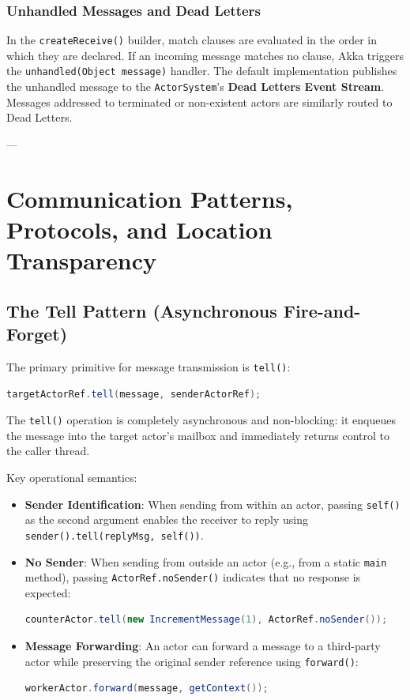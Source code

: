 \subsubsection{Unhandled Messages and Dead Letters}
In the \texttt{createReceive()} builder, match clauses are evaluated in the order in which they are declared. If an incoming message matches no clause, Akka triggers the \texttt{unhandled(Object message)} handler. The default implementation publishes the unhandled message to the \texttt{ActorSystem}'s \textbf{Dead Letters Event Stream}. Messages addressed to terminated or non-existent actors are similarly routed to Dead Letters.

---

\section{Communication Patterns, Protocols, and Location Transparency}

\subsection{The Tell Pattern (Asynchronous Fire-and-Forget)}
The primary primitive for message transmission is \texttt{tell()}:
\begin{lstlisting}[language=Java]
targetActorRef.tell(message, senderActorRef);
\end{lstlisting}
The \texttt{tell()} operation is completely asynchronous and non-blocking: it enqueues the message into the target actor's mailbox and immediately returns control to the caller thread.

Key operational semantics:
\begin{itemize}
    \item \textbf{Sender Identification}: When sending from within an actor, passing \texttt{self()} as the second argument enables the receiver to reply using \texttt{sender().tell(replyMsg, self())}.
    \item \textbf{No Sender}: When sending from outside an actor (e.g., from a static \texttt{main} method), passing \texttt{ActorRef.noSender()} indicates that no response is expected:
    \begin{lstlisting}[language=Java]
counterActor.tell(new IncrementMessage(1), ActorRef.noSender());
    \end{lstlisting}
    \item \textbf{Message Forwarding}: An actor can forward a message to a third-party actor while preserving the original sender reference using \texttt{forward()}:
    \begin{lstlisting}[language=Java]
workerActor.forward(message, getContext());
    \end{lstlisting}
\end{itemize}

